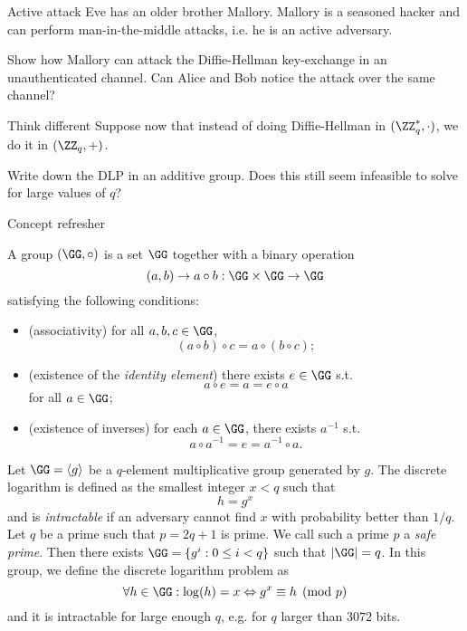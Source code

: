 \documentclass{practice}
\begin{document}
\newpage

\begin{task}{Active attack}
  Eve has an older brother Mallory.
  Mallory is a seasoned hacker and can perform man-in-the-middle attacks, i.e. he is an active adversary.

  Show how Mallory can attack the Diffie-Hellman key-exchange in an unauthenticated channel.
  Can Alice and Bob notice the attack over the same channel?
\end{task}

\begin{task}{Think different}
  Suppose now that instead of doing Diffie-Hellman in $(\ZZ^*_q, \cdot)$, we do it in $(\ZZ_q, +)$.
  
  Write down the DLP in an additive group.
  Does this still seem infeasible to solve for large values of $q$?
\end{task}

\newpage

\begin{center}
  Concept refresher
\end{center}

\begin{tcolorbox}[title=Definition of a group]
  A group $(\GG, \circ)$ is a set $\GG$ together with a binary operation
  \[
    (a, b)\to a\circ b: \GG \times \GG \to \GG
  \]
  satisfying the following conditions:
  \begin{itemize}
    \item (associativity) for all $a,b,c\in\GG$,
    \[
      (a \circ b) \circ c = a \circ (b\circ c);
    \]
    \item (existence of the \emph{identity element}) there exists $e\in\GG$ s.t.
    \[a \circ e = a = e \circ a\]
    for all $a \in \GG$;
    \item (existence of inverses) for each $a\in\GG$, there exists $a^{-1}$ s.t.
    \[
      a\circ a^{-1} = e = a^{-1} \circ a.
    \]
  \end{itemize}
\end{tcolorbox}

\begin{tcolorbox}[title=Discrete logarithm problem]
  Let $\GG = \langle g \rangle$ be a $q$-element multiplicative group generated by $g$.
  The discrete logarithm is defined as the smallest integer $x < q$ such that
  \[
    h = g^x
  \]
  and is \emph{intractable} if an adversary cannot find $x$ with probability better than $1/q$.
  \tcblower
  Let $q$ be a prime such that $p = 2q + 1$ is prime.
  We call such a prime $p$ a \emph{safe prime}.
  Then there exists $\GG = \{g^i : 0 \le i < q\}$ such that $\lvert \GG \rvert = q$.
  In this group, we define the discrete logarithm problem as
  \[
    \forall h\in\GG : \log(h) = x \Leftrightarrow g^x \equiv h \pmod{p}
  \]
  and it is intractable for large enough $q$, e.g. for $q$ larger than $3072$ bits.
\end{tcolorbox}
\end{document}
